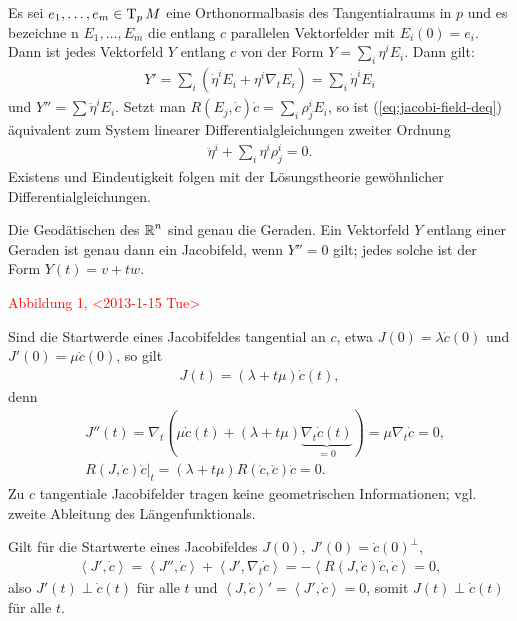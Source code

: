 \begin{bew}
  Es sei $e_1, \ldots, e_m \in \operatorname{T}_pM$ eine Orthonormalbasis des
  Tangentialraums in $p$ und es bezeichne n $E_1, \ldots, E_m$ die
  entlang $c$ parallelen Vektorfelder mit $E_i(0) = e_i$. Dann ist
  jedes Vektorfeld $Y$ entlang $c$ von der Form $Y = \sum_i
  \eta^iE_i$. Dann gilt:
  \begin{align*}
    Y' = \sum_i (\dot \eta^i E_i + \eta^i\nabla_tE_i) = \sum_i \dot
    \eta^i E_i
  \end{align*}
  und $Y'' = \sum \ddot \eta^i E_i$. Setzt man $R(E_j,\dot c)\dot c =
  \sum_i\rho_j^i E_i$, so ist (\ref{eq:jacobi-field-deq}) äquivalent
  zum System linearer Differentialgleichungen zweiter Ordnung
  \begin{align*}
    \ddot \eta^i + \sum_i \eta^i\rho_j^i = 0.
  \end{align*}
  Existens und Eindeutigkeit folgen mit der Lösungstheorie
  gewöhnlicher Differentialgleichungen.
\end{bew}

\begin{bsp}
  Die Geodätischen des $\operatorname{\mathbb{R}}^n$ sind genau die Geraden. Ein Vektorfeld
  $Y$ entlang einer Geraden ist genau dann ein Jacobifeld, wenn $Y'' =
  0$ gilt; jedes solche ist der Form $Y(t) = v + tw$.

  \begin{center}
    \textcolor{red}{Abbildung 1, <2013-1-15 Tue>}
  \end{center}
\end{bsp}

Sind die Startwerde eines Jacobifeldes tangential an $c$, etwa $J(0) =
\lambda \dot c(0)$ und $J'(0) = \mu \dot c(0)$, so gilt
\begin{align*}
  J(t) = (\lambda + t\mu)\dot c(t),
\end{align*}
denn
\begin{align*}
  & J''(t) = \nabla_t(\mu \dot c(t) + (\lambda + t
  \mu)\underbrace{\nabla_t\dot c(t)}_{=0}) = \mu\nabla_t\dot c = 0,\\
  & \left.R(J,\dot c)\dot c\right|_t = (\lambda + t\mu)R(\dot c, \dot
  c)\dot c = 0.
\end{align*}
Zu $c$ tangentiale Jacobifelder tragen keine geometrischen
Informationen; vgl. zweite Ableitung des Längenfunktionals.

Gilt für die Startwerte eines Jacobifeldes $J(0),\ J'(0) = \dot
c(0)^{\perp}$,
\begin{align*}
  \left<J',\dot c\right> = \left<J'',\dot c\right> + \left<J',
    \nabla_t\dot c\right> = - \left<R(J,\dot c)\dot c,\dot c\right> =
  0,
\end{align*}
also $J'(t) \perp \dot c(t)$ für alle $t$ und $\left<J,\dot c\right>'
= \left<J',\dot c\right> = 0$, somit $J(t) \perp \dot c(t)$ für alle
$t$.

